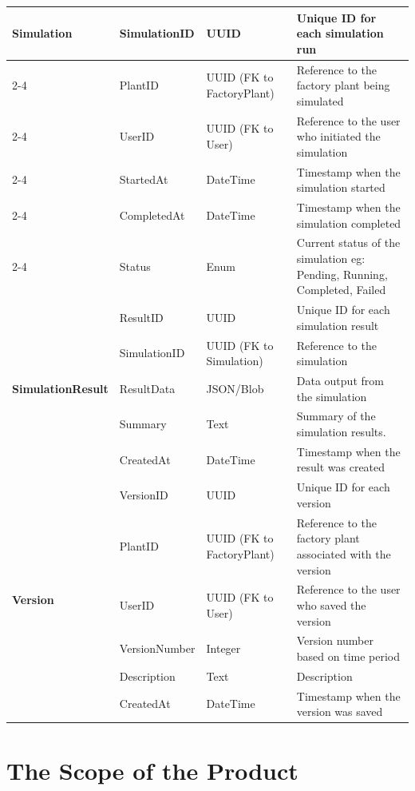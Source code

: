 \documentclass[12pt]{article}
\begin{document}
\begin{longtable}{|p{3.5cm}|p{3.25cm}|p{2cm}|p{6cm}|}
  \multirow{6}{*}{\textbf{Simulation}} & SimulationID & UUID & Unique ID for each simulation run \\
  \cline{2-4}
  & PlantID & UUID (FK to FactoryPlant) & Reference to the factory plant being simulated \\
  \cline{2-4}
  & UserID & UUID (FK to User) & Reference to the user who initiated the simulation \\
  \cline{2-4}
  & StartedAt & DateTime & Timestamp when the simulation started \\
  \cline{2-4}
  & CompletedAt & DateTime & Timestamp when the simulation completed \\
  \cline{2-4}
  & Status & Enum & Current status of the simulation eg: Pending, Running, Completed, Failed \\
  \hline
  
  \multirow{5}{*}{\textbf{SimulationResult}} & ResultID & UUID & Unique ID for each simulation result \\
  \cline{2-4}
  & SimulationID & UUID (FK to Simulation) & Reference to the simulation\\
  \cline{2-4}
  & ResultData & JSON/Blob & Data output from the simulation \\
  \cline{2-4}
  & Summary & Text & Summary of the simulation results. \\
  \cline{2-4}
  & CreatedAt & DateTime & Timestamp when the result was created \\
  \hline
  
  \multirow{6}{*}{\textbf{Version}} & VersionID & UUID & Unique ID for each version \\
  \cline{2-4}
  & PlantID & UUID (FK to FactoryPlant) & Reference to the factory plant associated with the version \\
  \cline{2-4}
  & UserID & UUID (FK to User) & Reference to the user who saved the version \\
  \cline{2-4}
  & VersionNumber & Integer &  Version number based on time period \\
  \cline{2-4}
  & Description & Text & Description \\
  \cline{2-4}
  & CreatedAt & DateTime & Timestamp when the version was saved \\
  \hline
\end{longtable}
  
\section{The Scope of the Product}
\end{document}
